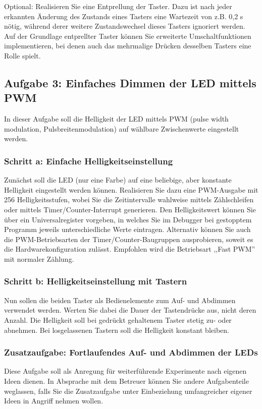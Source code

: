 \documentclass[a4paper,12pt,titlepage]{scrartcl}
\begin{document}
Optional: Realisieren Sie eine Entprellung der Taster. Dazu ist nach jeder erkannten Änderung des Zustands eines Tasters eine Wartezeit von z.B. 0,2 s nötig, während derer weitere Zustandswechsel dieses Tasters ignoriert werden. Auf der Grundlage entprellter Taster können Sie erweiterte Umschaltfunktionen implementieren, bei denen auch das mehrmalige Drücken desselben Tasters eine Rolle spielt.

\subsection*{Aufgabe 3: Einfaches Dimmen der LED mittels PWM}
In dieser Aufgabe soll die Helligkeit der LED mittels PWM (pulse width modulation, Pulsbreitenmodulation) auf wählbare Zwischenwerte eingestellt werden.

\subsubsection*{Schritt a: Einfache Helligkeitseinstellung}
Zunächst soll die LED (nur eine Farbe) auf eine beliebige, aber konstante Helligkeit eingestellt werden können. Realisieren Sie dazu eine PWM-Ausgabe mit 256 Helligkeitsstufen, wobei Sie die Zeitintervalle wahlweise mittels Zählschleifen oder mittels Timer/Counter-Interrupt generieren. Den Helligkeitswert können Sie über ein Universalregister vorgeben, in welches Sie im Debugger bei gestopptem Programm jeweils unterschiedliche Werte eintragen.
Alternativ können Sie auch die PWM-Betriebsarten der Timer/Counter-Baugruppen ausprobieren, soweit es die Hardwarekonfiguration zulässt. Empfohlen wird die Betriebsart ,,Fast PWM'' mit normaler Zählung.

\subsubsection*{Schritt b: Helligkeitseinstellung mit Tastern}
Nun sollen die beiden Taster als Bedienelemente zum Auf- und Abdimmen verwendet werden. Werten Sie dabei die Dauer der Tastendrücke aus, nicht deren Anzahl. Die Helligkeit soll bei gedrückt gehaltenem Taster stetig zu- oder abnehmen. Bei losgelassenen Tastern soll die Helligkeit konstant bleiben.

\subsubsection*{Zusatzaufgabe: Fortlaufendes Auf- und Abdimmen der LEDs}
Diese Aufgabe soll als Anregung für weiterführende Experimente nach eigenen Ideen dienen. In Absprache mit dem Betreuer können Sie andere Aufgabenteile weglassen, falls Sie die Zusatzaufgabe unter Einbeziehung umfangreicher eigener Ideen in Angriff nehmen wollen.
\end{document}

